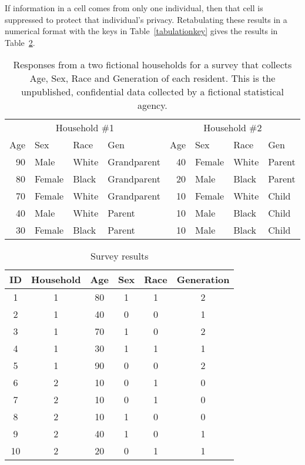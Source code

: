 \documentclass[runningheads]{llncs}
\begin{document}
If
information in a cell comes from only one individual, then that cell
is suppressed to protect that individual's privacy.  Retabulating
these results in a numerical format with the keys in
Table~\ref{tabulationkey} gives the results in Table~\ref{resultsbig}.


\begin{table}
\begin{tabular}{rllp{1in}||rllp{1in}}
\multicolumn{4}{c||}{Household \#1}    & \multicolumn{4}{c}{Household \#2} \\
Age & Sex & Race & Gen                 & Age & Sex & Race & Gen \\
\hline
90 & Male & White & Grandparent        & 40 & Female & White & Parent\\
80 & Female & Black & Grandparent      & 20 & Male & Black & Parent\\
70 & Female & White & Grandparent      & 10 & Female & White & Child\\
40 & Male & White & Parent             & 10 & Male & Black & Child\\
30 & Female & Black & Parent           & 10 & Male & Black & Child\\
\hline
\end{tabular}
\caption{Responses from a two fictional households
for a survey that collects Age, Sex, Race and Generation of each resident. This is
the unpublished, confidential data collected by a fictional statistical
agency.}\label{responses}
\end{table}


\begin{table}
\begin{tabular}{c|c|c|c|c|c}
ID & Household & Age & Sex & Race & Generation \\
\hline
1 & 1 & 80 & 1 & 1 & 2  \\
2 & 1 & 40 & 0 & 0 & 1  \\
3 & 1 & 70 & 1 & 0 & 2  \\
4 & 1 & 30 & 1 & 1 & 1  \\
5 & 1 & 90 & 0 & 0 & 2  \\
6 & 2 & 10 & 0 & 1 & 0  \\
7 & 2 & 10 & 0 & 1 & 0  \\
8 & 2 & 10 & 1 & 0 & 0  \\
9 & 2 & 40 & 1 & 0 & 1 \\
10 & 2 & 20 & 0 & 1 & 1 \\
\hline
\end{tabular}
\caption{Survey results}
\label{resultsbig}
\end{table}
\end{document}

